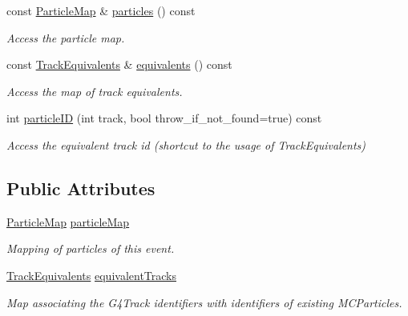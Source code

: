 \begin{DoxyCompactItemize}
const \hyperlink{class_d_d4hep_1_1_simulation_1_1_geant4_particle_map_a065c5fb0629285022b9aa2a628bffef3}{Particle\+Map} \& \hyperlink{class_d_d4hep_1_1_simulation_1_1_geant4_particle_map_a6e8245c2158d512a24687c458305a251}{particles} () const
\begin{DoxyCompactList}\small\item\em Access the particle map. \end{DoxyCompactList}\item 
const \hyperlink{class_d_d4hep_1_1_simulation_1_1_geant4_particle_map_aba09f5fcb2dd5874d129660ad4454a21}{Track\+Equivalents} \& \hyperlink{class_d_d4hep_1_1_simulation_1_1_geant4_particle_map_ab89bd6bc306026573b1d0db0b31f83d3}{equivalents} () const
\begin{DoxyCompactList}\small\item\em Access the map of track equivalents. \end{DoxyCompactList}\item 
int \hyperlink{class_d_d4hep_1_1_simulation_1_1_geant4_particle_map_a25f6e10e268cd67d7bcc99eb71d095ba}{particle\+ID} (int track, bool throw\+\_\+if\+\_\+not\+\_\+found=true) const
\begin{DoxyCompactList}\small\item\em Access the equivalent track id (shortcut to the usage of Track\+Equivalents) \end{DoxyCompactList}\end{DoxyCompactItemize}
\subsection*{Public Attributes}
\begin{DoxyCompactItemize}
\item 
\hyperlink{class_d_d4hep_1_1_simulation_1_1_geant4_particle_map_a065c5fb0629285022b9aa2a628bffef3}{Particle\+Map} \hyperlink{class_d_d4hep_1_1_simulation_1_1_geant4_particle_map_ac5be2ea78909ee55da8e4008c4f727a0}{particle\+Map}
\begin{DoxyCompactList}\small\item\em Mapping of particles of this event. \end{DoxyCompactList}\item 
\hyperlink{class_d_d4hep_1_1_simulation_1_1_geant4_particle_map_aba09f5fcb2dd5874d129660ad4454a21}{Track\+Equivalents} \hyperlink{class_d_d4hep_1_1_simulation_1_1_geant4_particle_map_a61cdcde928de729988141a9cf643e9ad}{equivalent\+Tracks}
\begin{DoxyCompactList}\small\item\em Map associating the G4\+Track identifiers with identifiers of existing M\+C\+Particles. \end{DoxyCompactList}\end{DoxyCompactItemize}


